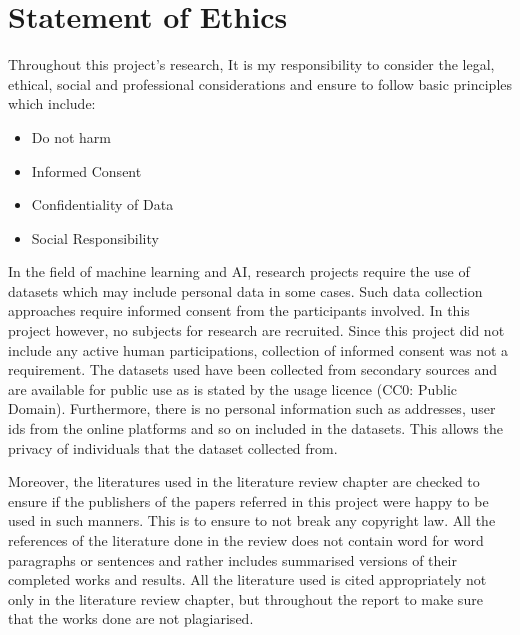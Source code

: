 
\chapter{Statement of Ethics}

Throughout this project's research, It is my responsibility to consider the legal, ethical, social and professional considerations and ensure to follow basic principles which include:
\begin{itemize}
    \item Do not harm
    \item Informed Consent
    \item Confidentiality of Data
    \item Social Responsibility
\end{itemize}

In the field of machine learning and AI, research projects require the use of datasets which may include personal data in some cases. Such data collection approaches require informed consent from the participants involved. In this project however, no subjects for research are recruited. Since this project did not include any active human participations, collection of informed consent was not a requirement. The datasets used have been collected from secondary sources and are available for public use as is stated by the usage licence (CC0: Public Domain)\cite{Pandey_2021}. Furthermore, there is no personal information such as addresses, user ids from the online platforms and so on included in the datasets. This allows the privacy of individuals that the dataset collected from.

Moreover, the literatures used in the literature review chapter are checked to ensure if the publishers of the papers referred in this project were happy to be used in such manners. This is to ensure to not break any copyright law. All the references of the literature done in the review does not contain word for word paragraphs or sentences and rather includes summarised versions of their completed works and results. All the literature used is cited appropriately not only in the literature review chapter, but throughout the report to make sure that the works done are not plagiarised.

